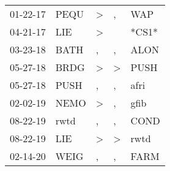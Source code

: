 \begin{supertabular}{p{0.07\textwidth}p{0.06\textwidth}p{0.02\textwidth}p{0.02\textwidth}p{0.06\textwidth}}
          01-22-17\textsuperscript{} &           PEQU\textsuperscript{} &     \textgreater &                , &            WAP\textsuperscript{} \\
          04-21-17\textsuperscript{} &            LIE\textsuperscript{} &     \textgreater &                  &                            *CS1* \\
          03-23-18\textsuperscript{} &           BATH\textsuperscript{} &                , &                , &           ALON\textsuperscript{} \\
          05-27-18\textsuperscript{} &           BRDG\textsuperscript{} &     \textgreater &     \textgreater &           PUSH\textsuperscript{} \\
          05-27-18\textsuperscript{} &           PUSH\textsuperscript{} &                , &                , &           afri\textsuperscript{} \\
          02-02-19\textsuperscript{} &           NEMO\textsuperscript{} &     \textgreater &                , &           gfib\textsuperscript{} \\
          08-22-19\textsuperscript{} &           rwtd\textsuperscript{} &                , &                , &           COND\textsuperscript{} \\
          08-22-19\textsuperscript{} &            LIE\textsuperscript{} &     \textgreater &     \textgreater &           rwtd\textsuperscript{} \\
          02-14-20\textsuperscript{} &           WEIG\textsuperscript{} &                , &                , &           FARM\textsuperscript{} \\
\end{supertabular}
